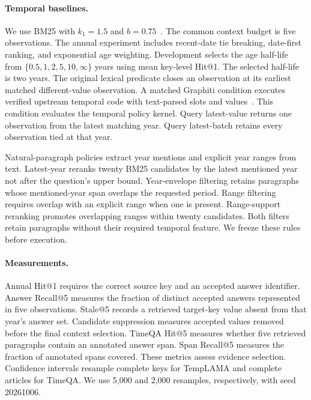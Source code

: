 \paragraph{Temporal baselines.}
We use BM25 with $k_1=1.5$ and $b=0.75$~\citep{robertson1995bm25}.
The common context budget is five observations.
The annual experiment includes recent-date tie breaking, date-first ranking, and exponential age weighting.
Development selects the age half-life from $\{0.5,1,2,5,10,\infty\}$ years using mean key-level Hit@1.
The selected half-life is two years.
The original lexical predicate closes an observation at its earliest matched different-value observation.
A matched Graphiti condition executes verified upstream temporal code with text-parsed slots and values~\citep{graphiti2026source}.
This condition evaluates the temporal policy kernel.
Query latest-value returns one observation from the latest matching year.
Query latest-batch retains every observation tied at that year.

Natural-paragraph policies extract year mentions and explicit year ranges from text.
Latest-year reranks twenty BM25 candidates by the latest mentioned year not after the question's upper bound.
Year-envelope filtering retains paragraphs whose mentioned-year span overlaps the requested period.
Range filtering requires overlap with an explicit range when one is present.
Range-support reranking promotes overlapping ranges within twenty candidates.
Both filters retain paragraphs without their required temporal feature.
We freeze these rules before execution.

\paragraph{Measurements.}
Annual Hit@1 requires the correct source key and an accepted answer identifier.
Answer Recall@5 measures the fraction of distinct accepted answers represented in five observations.
Stale@5 records a retrieved target-key value absent from that year's answer set.
Candidate suppression measures accepted values removed before the final context selection.
TimeQA Hit@5 measures whether five retrieved paragraphs contain an annotated answer span.
Span Recall@5 measures the fraction of annotated spans covered.
These metrics assess evidence selection.
Confidence intervals resample complete keys for TempLAMA and complete articles for TimeQA.
We use 5,000 and 2,000 resamples, respectively, with seed 20261006.
